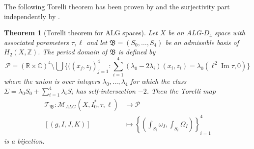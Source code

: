 \documentclass[12pt,letterpaper,reqno]{amsart}
\newtheorem{thm}{Theorem}
\theoremstyle{remark}
\theoremstyle{definition}
\numberwithin{thm}{section}
\numberwithin{equation}{section}
\numberwithin{figure}{section}
\newcommand{\R}{\ensuremath{\mathbb R}}
\newcommand{\C}{\ensuremath{\mathbb C}}
\newcommand{\Z}{\ensuremath{\mathbb Z}}
\newcommand{\calP}{\mathcal P}
\newcommand{\calM}{\mathcal M}
\newcommand{\frakB}{\mathfrak B}
\DeclareMathOperator{\im}{Im}
\begin{document}
The following Torelli theorem has been proven by \cite{CVZ2024} and the surjectivity part independently by \cite{LeeLin}.
\begin{thm}[Torelli theorem  for ALG spaces] Let $X$ be an ALG-$D_4$ space with associated parameters $\tau, \ell$ and let $\mathfrak{B}=(S_0, \ldots, S_4)$ be an admissible basis of $H_2(X,\Z)$. 
The period domain of $\mathfrak{B}$ is defined by 
\begin{equation}\label{eq:P}
 \calP = (\R \times \C)^4 \setminus\bigcup \{( (x_j, z_j)_{j=1}^4: \sum_{i=1}^4 (\lambda_0 - 2 \lambda_i)(x_i,z_i) = \lambda_0 (\ell^2 \im \tau, 0) \}
\end{equation}
where the union is over integers $\lambda_0, \ldots , \lambda_4$ for which the class $\Sigma = \lambda_0  S_0 + \sum_{i=1}^4 \lambda_i S_i$ has self-intersection $-2$.
Then the Torelli map
\begin{align}
\mathcal{T}_{\frakB} : \calM_{ALG}(X,I_0^*,\tau, \ell) &\longrightarrow \calP \\ \nonumber
 [(g, I, J, K)] &\longmapsto \left\{\left( \int_{S_i} \omega_I, \int_{S_i} \Omega_I \right)\right\}_{i=1}^4
\end{align}
is a bijection.
\end{thm}
\end{document}
